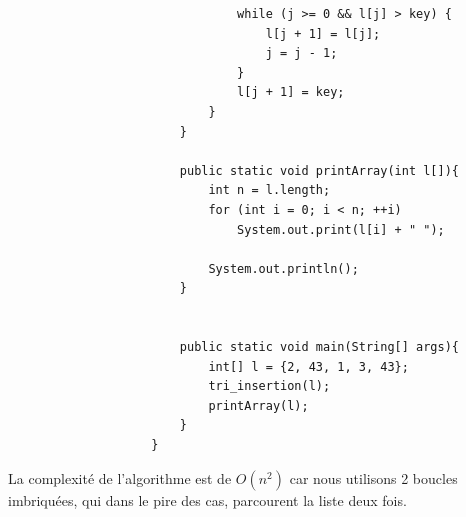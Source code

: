 \begin{Exercice} [20 minutes]
\begin{itemize}
\begin{verbatim}
                                while (j >= 0 && l[j] > key) { 
                                    l[j + 1] = l[j]; 
                                    j = j - 1; 
                                } 
                                l[j + 1] = key; 
                            }
                        }
                        
                        public static void printArray(int l[]){ 
                            int n = l.length; 
                            for (int i = 0; i < n; ++i) 
                                System.out.print(l[i] + " "); 
                      
                            System.out.println(); 
                        } 
              
                        
                        public static void main(String[] args){
                            int[] l = {2, 43, 1, 3, 43};
                            tri_insertion(l);
                            printArray(l);
                        }
                    }
                \end{verbatim}
    \end{itemize}
    
    La complexité de l'algorithme est de $O(n^2)$ car nous utilisons 2 boucles imbriquées, qui dans le pire des cas, parcourent la liste deux fois.
    
\end{Exercice}

